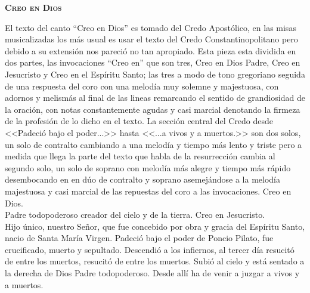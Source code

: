 \documentclass[12pt, letterpaper]{report}
\begin{document}

    \begin{center}
        {\scshape \Huge {\bfseries Creo en Dios}}
    \end{center}

    \Large El texto del canto “Creo en Dios” es tomado del Credo Apost\'olico,
    en las misas musicalizadas los m\'as usual es usar el texto del Credo Constantinopolitano
    pero debido a su extensi\'on nos pareci\'o no tan apropiado. Esta pieza esta dividida en dos partes,
    las invocaciones  “Creo en” que son tres, Creo en Dios Padre, Creo en Jesucristo y Creo en el Esp\'iritu Santo;
    las tres a modo de tono gregoriano seguida de una respuesta del coro con una melod\'ia muy solemne y majestuosa,
    con adornos y melism\'as al final de las lineas remarcando el sentido de grandiosidad de la oraci\'on,
    con notas constantemente agudas y casi marcial denotando la firmeza de la profesi\'on de lo dicho en el texto.
    La secci\'on central del Credo desde <<Padeci\'o bajo el poder...>> hasta <<...a vivos y a muertos.>> son dos solos,
    un solo de contralto cambiando a una melod\'ia y tiempo m\'as lento y triste pero a medida que llega la parte del
    texto que habla de la resurrecci\'on cambia al segundo solo, un solo de soprano con melod\'ia m\'as alegre y tiempo
    m\'as r\'apido desembocando en en d\'uo de contralto y soprano asemej\'andose a la melod\'ia majestuosa y casi marcial
    de las repuestas del coro a las invocaciones.
    \newline
    \noindent
    \LARGE Creo en Dios. \\
    Padre todopoderoso creador del cielo y de la tierra.
    \newline
    \noindent
    Creo en Jesucristo. \\
    Hijo \'unico, nuestro Se\~nor, que fue concebido por obra y gracia del Esp\'iritu Santo, nacio de Santa Mar\'ia Virgen.
    \newline
    \noindent
    Padeci\'o bajo el poder de Poncio Pilato, fue crucificado, muerto y sepultado. Descendi\'o a los infiernos, al tercer d\'ia resucit\'o de entre los muertos, resucit\'o de entre los muertos.
    \newline
    \noindent
    Subi\'o al cielo y est\'a sentado a la derecha de Dios Padre todopoderoso. Desde all\'i ha de venir a juzgar a vivos y a muertos.
\end{document}
